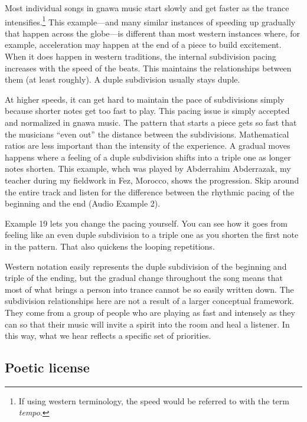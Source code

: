\documentclass[twoside]{article}
\begin{document}
Most individual songs in gnawa music start slowly and get faster as the
trance intensifies.\footnote{If using western terminology, the speed
  would be referred to with the term \emph{tempo}.} This example---and
many similar instances of speeding up gradually that happen across the
globe---is different than most western instances where, for example,
acceleration may happen at the end of a piece to build excitement. When
it does happen in western traditions, the internal subdivision pacing
increases with the speed of the beats. This maintains the relationships
between them (at least roughly). A duple subdivision usually stays
duple.

At higher speeds, it can get hard to maintain the pace of subdivisions
simply because shorter notes get too fast to play. This pacing issue is
simply accepted and normalized in gnawa music. The pattern that starts a
piece gets so fast that the musicians ``even out'' the distance between
the subdivisions. Mathematical ratios are less important than the
intensity of the experience. A gradual moves happens where a feeling of
a duple subdivision shifts into a triple one as longer notes shorten.
This example, whch was played by Abderrahim Abderrazak, my teacher
during my fieldwork in Fez, Morocco, shows the progression. Skip around
the entire track and listen for the difference between the rhythmic
pacing of the beginning and the end (Audio Example 2).

Example 19 lets you change the pacing yourself. You can see how it
goes from feeling like an even duple subdivision to a triple one as you
shorten the first note in the pattern. That also quickens the looping
repetitions.

Western notation easily represents the duple subdivision of the
beginning and triple of the ending, but the gradual change throughout
the song means that most of what brings a person into trance cannot be
so easily written down. The subdivision relationships here are not a
result of a larger conceptual framework. They come from a group of
people who are playing as fast and intensely as they can so that their
music will invite a spirit into the room and heal a listener. In this
way, what we hear reflects a specific set of priorities.

\hypertarget{poetic-license}{%
\subsection*{Poetic license}\label{poetic-license}}
\end{document}
